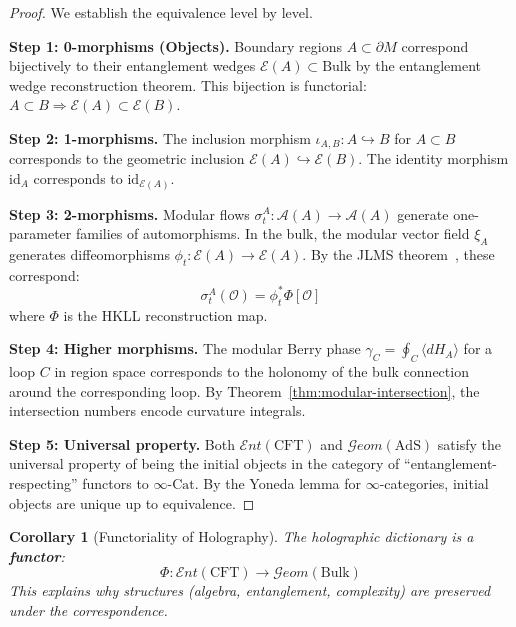 \documentclass[12pt,a4paper]{article}
\newtheorem{corollary}[theorem]{Corollary}
\begin{document}
\begin{proof}
We establish the equivalence level by level.

\textbf{Step 1: 0-morphisms (Objects).}
Boundary regions $A \subset \partial M$ correspond bijectively to their entanglement wedges $\mathcal{E}(A) \subset \text{Bulk}$ by the entanglement wedge reconstruction theorem. This bijection is functorial: $A \subset B \Rightarrow \mathcal{E}(A) \subset \mathcal{E}(B)$.

\textbf{Step 2: 1-morphisms.}
The inclusion morphism $\iota_{A,B}: A \hookrightarrow B$ for $A \subset B$ corresponds to the geometric inclusion $\mathcal{E}(A) \hookrightarrow \mathcal{E}(B)$. The identity morphism $\text{id}_A$ corresponds to $\text{id}_{\mathcal{E}(A)}$.

\textbf{Step 3: 2-morphisms.}
Modular flows $\sigma_t^A: \mathcal{A}(A) \to \mathcal{A}(A)$ generate one-parameter families of automorphisms. In the bulk, the modular vector field $\xi_A$ generates diffeomorphisms $\phi_t: \mathcal{E}(A) \to \mathcal{E}(A)$. By the JLMS theorem~\cite{jafferis2016}, these correspond:
\begin{equation}
\sigma_t^A(\mathcal{O}) = \phi_t^* \Phi[\mathcal{O}]
\end{equation}
where $\Phi$ is the HKLL reconstruction map.

\textbf{Step 4: Higher morphisms.}
The modular Berry phase $\gamma_C = \oint_C \langle dH_A \rangle$ for a loop $C$ in region space corresponds to the holonomy of the bulk connection around the corresponding loop. By Theorem~\ref{thm:modular-intersection}, the intersection numbers encode curvature integrals.

\textbf{Step 5: Universal property.}
Both $\mathcal{E}nt(\text{CFT})$ and $\mathcal{G}eom(\text{AdS})$ satisfy the universal property of being the initial objects in the category of ``entanglement-respecting'' functors to $\infty\text{-Cat}$. By the Yoneda lemma for $\infty$-categories, initial objects are unique up to equivalence.
\end{proof}

\begin{corollary}[Functoriality of Holography]
The holographic dictionary is a \textbf{functor}:
\begin{equation}
\Phi: \mathcal{E}nt(\text{CFT}) \to \mathcal{G}eom(\text{Bulk})
\end{equation}
This explains why structures (algebra, entanglement, complexity) are preserved under the correspondence.
\end{corollary}
\end{document}

